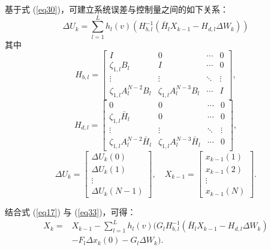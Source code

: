 基于式 (\ref{eq30})，可建立系统误差与控制量之间的如下关系：
\begin{equation}
\Delta U_k = \sum_{l=1}^{L} h_l(v) \left( H_{b,l}^{-1} \left( \bar{H}_l X_{k-1} - H_{d,l} \Delta W_k \right) \right)
\label{eq33}
\end{equation}
其中
\begin{equation*}
H_{b,l} = \left[\begin{array}{cccc}
I & 0 & \cdots & 0 \\
\zeta_{1,l} B_l & I & \cdots & 0 \\
\vdots & \vdots & \ddots & \vdots \\
\zeta_{1,l} A_l^{N-2} B_l & \zeta_{1,l} A_l^{N-3} B_l & \cdots & I
\end{array}\right],
\end{equation*}
\begin{equation*}
H_{d,l} = \left[\begin{array}{cccc}
0 & 0 & \cdots & 0 \\
\zeta_{1,l} \bar{H}_l & 0 & \cdots & 0 \\
\vdots & \vdots & \ddots & \vdots \\
\zeta_{1,l} A_l^{N-2} \bar{H}_l & \zeta_{1,l} A_l^{N-3} \bar{H}_l & \cdots & 0
\end{array}\right],
\end{equation*}
\begin{equation*}
\Delta U_k = \left[\begin{array}{c}
\Delta U_k(0) \\
\Delta U_k(1) \\
\vdots \\
\Delta U_k(N-1)
\end{array}\right],
\quad
X_{k-1} = \left[\begin{array}{c}
x_{k-1}(1) \\
x_{k-1}(2) \\
\vdots \\
x_{k-1}(N)
\end{array}\right].
\end{equation*}

结合式 (\ref{eq17}) 与 (\ref{eq33})，可得：
\begin{equation}
\begin{aligned}
X_k = & X_{k-1} - \sum_{l=1}^{L} h_l(v) \Big( G_l H_{b,l}^{-1} \left( \bar{H}_l X_{k-1} - H_{d,l} \Delta W_k \right) \\
& - F_l \Delta x_k(0) - G_l \Delta W_k \Big).
\end{aligned}
\label{eq34}
\end{equation}

